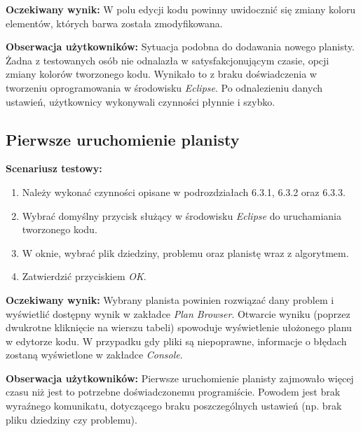 \textbf{Oczekiwany wynik:} W polu edycji kodu powinny uwidocznić się zmiany koloru elementów, których barwa została zmodyfikowana.

\textbf{Obserwacja użytkowników:} Sytuacja podobna do dodawania nowego planisty. Żadna z testowanych osób nie odnalazła w satysfakcjonującym czasie, opcji zmiany kolorów tworzonego kodu. Wynikało to z braku doświadczenia w tworzeniu oprogramowania w środowisku \textit{Eclipse}. Po odnalezieniu danych ustawień, użytkownicy wykonywali czynności płynnie i szybko. 
\subsection{Pierwsze uruchomienie planisty}
\textbf{Scenariusz testowy:}
  \begin{enumerate}
  
\item Należy wykonać czynności opisane w podrozdziałach 6.3.1, 6.3.2 oraz 6.3.3.
\item Wybrać domyślny przycisk służący w środowisku \textit{Eclipse} do uruchamiania tworzonego kodu.
\item W oknie, wybrać plik dziedziny, problemu oraz planistę wraz z algorytmem.
\item Zatwierdzić przyciskiem \textit{OK}. 
\end{enumerate}

\textbf{Oczekiwany wynik:} Wybrany planista powinien rozwiązać dany problem i wyświetlić dostępny wynik w zakładce \textit{Plan Browser}. Otwarcie wyniku (poprzez dwukrotne kliknięcie na wierszu tabeli) spowoduje wyświetlenie ułożonego planu w edytorze kodu. W przypadku gdy pliki są niepoprawne, informacje o błędach zostaną wyświetlone w zakładce \textit{Console}. 

\textbf{Obserwacja użytkowników:} Pierwsze uruchomienie planisty zajmowało więcej czasu niż jest to potrzebne doświadczonemu programiście. Powodem jest brak wyraźnego komunikatu, dotyczącego braku poszczególnych ustawień (np. brak pliku dziedziny czy problemu).



